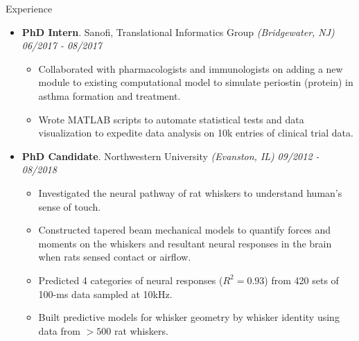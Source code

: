 \documentclass{resume} %
\begin{document}
\begin{rSection}{Experience}
\begin{itemize}[leftmargin=0em]
	\item {\bf PhD Intern}{. Sanofi, Translational Informatics Group \textit{(Bridgewater, NJ)}} \hfill {\em 06/2017 - 08/2017}\\
	\vspace{-5mm}
	\begin{itemize}
		\setlength\itemsep{-1.75em}	
		\item Collaborated with pharmacologists and immunologists on adding a new module to existing computational model to simulate periostin (protein) in asthma formation and treatment.\\
		\item Wrote MATLAB scripts to automate statistical tests and data visualization to expedite data analysis on 10k entries of clinical trial data.
	\end{itemize}

	\item {\bf PhD Candidate}{. Northwestern University \textit{(Evanston, IL)}} \hfill {\em 09/2012 - 08/2018}\\
	\vspace{-5mm}
	\begin{itemize}
		\setlength\itemsep{-1.75em}
		\item Investigated the neural pathway of rat whiskers to understand human's sense of touch.\\
		\item Constructed tapered beam mechanical models to quantify forces and moments on the whiskers and resultant neural responses in the brain when rats sensed contact or airflow.\\
		\item Predicted 4 categories of neural responses ($R^2=0.93$) from 420 sets of 100-ms data sampled at 10kHz.\\
		\item Built predictive models for whisker geometry by whisker identity using data from $>500$ rat whiskers.	
	\end{itemize}

	
	\end{itemize}

\end{rSection}
\end{document}
